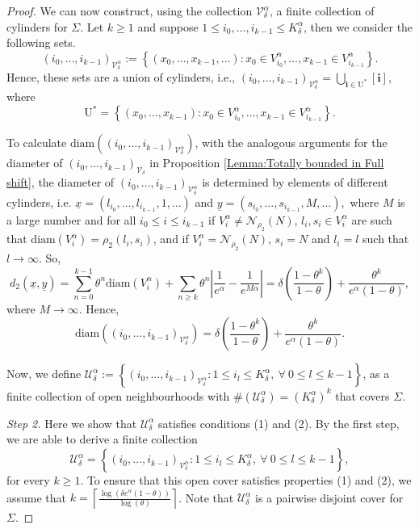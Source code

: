 \documentclass[11pt, reqno]{amsart}
\theoremstyle{plain}%
\theoremstyle{definition}
\theoremstyle{definition}
\def\U{\ensuremath{\mathcal U}}
\def\st{such that }
\def\ulx{\underline{x}}
\def\uly{\underline{y}}
\def\i{\textbf{i}}
\numberwithin{equation}{section}
\begin{document}
\begin{proof}
We can now construct, using the collection $\mathcal{V}_\delta^{\alpha}$, a finite collection of cylinders for $\Sigma$. Let $k\ge 1$ and suppose $1\le i_0,\ldots,i_{k-1}\le K_\delta^{\alpha}$, then we consider the following sets.
\begin{equation}\label{Def: Z_i_0 d_2+}
(i_0,\ldots,i_{k-1})_{\mathcal{V}_\delta^{\alpha}}:=\left\{ (x_0,\ldots,x_{k-1},\ldots): x_0\in V_{i_0}^{\alpha},\ldots,x_{k-1}\in V_{i_{k-1}}^{\alpha}  \right\}.\end{equation}
Hence, these sets are a union of cylinders, i.e., $(i_0,\ldots,i_{k-1})_{\mathcal{V}_\delta^{\alpha}}=\bigcup_{\i\in\mathrm{U^*}}[\i]$, where $$\mathrm{U^*}=\left\{ (x_0,\ldots,x_{k-1}):  x_0\in V_{i_0}^{\alpha},\ldots,x_{k-1}\in V_{i_{k-1}}^{\alpha}    \right\}.$$ 

To calculate $\text{diam}\left((i_0,\ldots,i_{k-1})_{\mathcal{V}_\delta^{\alpha}}\right)$, with the analogous arguments for the diameter of $(i_0,\ldots,i_{k-1})_{\mathcal{V}_\delta}$ in Proposition \ref{Lemma:Totally bounded in Full shift}, the diameter of $(i_0,\ldots,i_{k-1})_{\mathcal{V}_\delta^{\alpha}}$ is determined by elements of different cylinders, i.e. $\ulx=(l_{i_0},\ldots,l_{i_{k-1}},1,\ldots)$ and $\uly=(s_{i_0},\ldots,s_{i_{k-1}},M,\ldots),$
where $M$ is a large number and for all $i_0\le i\le i_{k-1}$ if $V_i^\alpha\neq\mathcal{N}_{\rho_2}(N)$, $l_i,s_i\in V_i^\alpha$ are \st $\text{diam}(V_i^\alpha)={\rho_2}(l_i,s_i)$, and if $V_i^\alpha=\mathcal{N}_{\rho_2}(N)$, $s_i=N$ and $l_i=l$ \st $l\to\infty$. So, $$ d_2(\ulx,\underline{y})=\sum_{n=0}^{k-1} \theta^n \text{diam}(V_i^{\alpha})+\sum_{n\ge k} \theta^n \left| \frac{1}{e^\alpha} - \frac{1}{e^{M\alpha}} \right|=  \delta\left(\frac{1-\theta^k}{1-\theta}\right)+\frac{\theta^k}{e^\alpha(1-\theta)},$$
where $M\to\infty$. 
Hence, 
\begin{equation} \label{Diam_Union_Full d_2+}
\text{diam}\left((i_0,\ldots,i_{k-1})_{\mathcal{V}_\delta^{\alpha}}\right)=\delta\left(\frac{1-\theta^k}{1-\theta}\right)+\frac{\theta^k}{e^\alpha(1-\theta)}.
\end{equation} 

Now, we define $\U_{\delta}^{\alpha}:=\left\{(i_0,\ldots,i_{k-1})_{\mathcal{V}_\delta^{\alpha}}: 1\le i_l\le K_{\delta}^{\alpha}, \ \forall \ 0\le l\le k-1 \right\}$, as a finite collection of open neighbourhoods with $\#(\U_{\delta}^{\alpha})=(K_\delta^{\alpha})^k$ that covers $\Sigma$.

\textit{Step 2.} Here we show that $\U_{\delta}^{\alpha}$ satisfies conditions (1) and (2). By the first step, we are able to derive a finite collection $$\U_{\delta}^{\alpha}=\left\{(i_0,\ldots,i_{k-1})_{\mathcal{V}_\delta^{\alpha}}: 1\le i_l\le K_{\delta}^{\alpha}, \ \forall \ 0\le l\le k-1 \right\},$$ for every $k\ge 1$. To ensure that this open cover satisfies properties (1) and (2), we assume that $k=\left\lceil \frac{\log(\delta e^{\alpha}(1-\theta))}{\log(\theta)}\right\rceil$.  Note that $\U_{\delta}^{\alpha}$ is a pairwise disjoint cover for $\Sigma$.


\end{proof}
\end{document}
